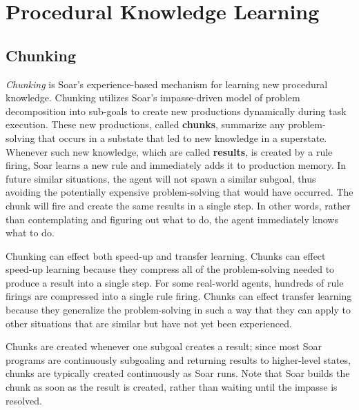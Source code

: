\chapter{Procedural Knowledge Learning}
\label{CHUNKING}

\section{Chunking}

\textit{Chunking} is Soar's experience-based mechanism for learning new procedural knowledge.  Chunking utilizes Soar's impasse-driven model of problem decomposition into sub-goals to create new productions dynamically during task execution.  These new productions, called \textbf{chunks}, summarize any problem-solving that occurs in a substate that led to new knowledge in a superstate.  Whenever such new knowledge, which are called \textbf{results}, is created by a rule firing, Soar learns a new rule and immediately adds it to production memory.  In future similar situations, the agent will not spawn a similar subgoal, thus avoiding the potentially expensive problem-solving that would have occurred.  The chunk will fire and create the same results in a single step.  In other words, rather than contemplating and figuring out what to do, the agent immediately knows what to do.  

Chunking can effect both speed-up and transfer learning.  Chunks can effect speed-up learning because they compress all of the problem-solving needed to produce a result into a single step.  For some real-world agents, hundreds of rule firings are compressed into a single rule firing.  Chunks can effect transfer learning because they generalize the problem-solving in such a way that they can apply to other situations that are similar but have not yet been experienced.

Chunks are created whenever one subgoal creates a result; since most Soar programs are continuously subgoaling and returning results to higher-level states, chunks are typically created continuously as Soar runs.  Note that Soar builds the chunk as soon as the result is created, rather than waiting until the impasse is resolved.

